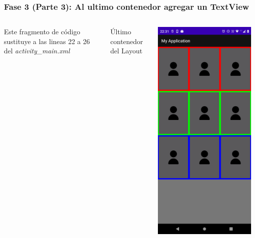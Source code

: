\begin{frame}[fragile]
\frametitle{Fase 3 (Parte 3): Al ultimo contenedor agregar un TextView} 
\begin{columns}

Este fragmento de c\'odigo sustituye a las lineas 22 a 26 del \textit{activity\_main.xml}
\begin{block}{\'Ultimo contenedor del Layout}
\inputminted[linenos,fontsize=\tiny]{xml}{00_CambiosInterfaz/Layout_Fase3C.xml}
\end{block}
\begin{center}
\includegraphics[width=0.95\linewidth]{CapturasPantalla/Fase3C.png}    
\end{center}
\end{columns}
\end{frame}

